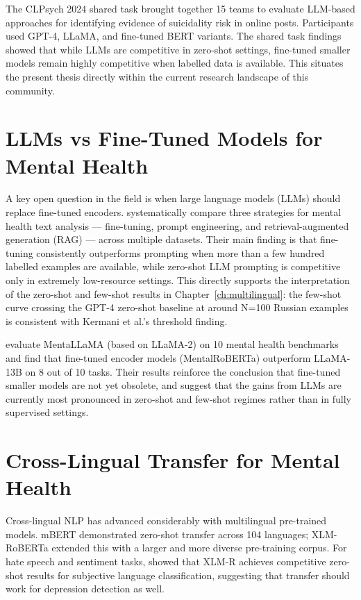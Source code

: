\documentclass[12pt, a4paper, oneside]{report}
\begin{document}
The CLPsych 2024 shared task \citep{chim2024clpsych} brought together 15 teams to evaluate LLM-based approaches for identifying evidence of suicidality risk in online posts. Participants used GPT-4, LLaMA, and fine-tuned BERT variants. The shared task findings showed that while LLMs are competitive in zero-shot settings, fine-tuned smaller models remain highly competitive when labelled data is available. This situates the present thesis directly within the current research landscape of this community.

\section{LLMs vs Fine-Tuned Models for Mental Health}

A key open question in the field is when large language models (LLMs) should replace fine-tuned encoders. \citet{kermani2025llm} systematically compare three strategies for mental health text analysis — fine-tuning, prompt engineering, and retrieval-augmented generation (RAG) — across multiple datasets. Their main finding is that fine-tuning consistently outperforms prompting when more than a few hundred labelled examples are available, while zero-shot LLM prompting is competitive only in extremely low-resource settings. This directly supports the interpretation of the zero-shot and few-shot results in Chapter~\ref{ch:multilingual}: the few-shot curve crossing the GPT-4 zero-shot baseline at around N=100 Russian examples is consistent with Kermani et al.'s threshold finding.

\citet{yang2024mentallama} evaluate MentaLLaMA (based on LLaMA-2) on 10 mental health benchmarks and find that fine-tuned encoder models (MentalRoBERTa) outperform LLaMA-13B on 8 out of 10 tasks. Their results reinforce the conclusion that fine-tuned smaller models are not yet obsolete, and suggest that the gains from LLMs are currently most pronounced in zero-shot and few-shot regimes rather than in fully supervised settings.

\section{Cross-Lingual Transfer for Mental Health}

Cross-lingual NLP has advanced considerably with multilingual pre-trained models. mBERT \citep{devlin2019bert} demonstrated zero-shot transfer across 104 languages; XLM-RoBERTa \citep{conneau2020unsupervised} extended this with a larger and more diverse pre-training corpus. For hate speech and sentiment tasks, \citet{Ansari2021} showed that XLM-R achieves competitive zero-shot results for subjective language classification, suggesting that transfer should work for depression detection as well.
\end{document}
